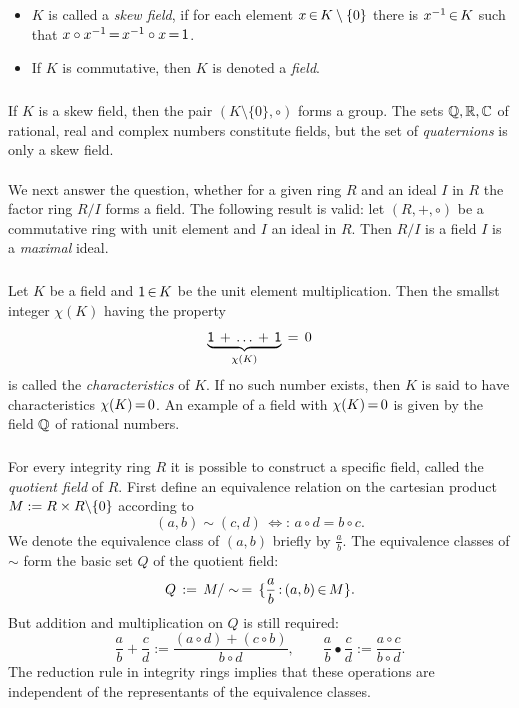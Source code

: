 \documentclass[11pt,twoside]{article}
\begin{document}
\begin{itemize}[leftmargin=15pt]
\item[1.]
$K$ is called a \textit{skew field},
if for each element $x {\,\in\,} K \setminus \{0\}$ there is $x^{-1} {\,\in\,} K$ 
such that $x \circ x^{-1} {\,=\,} x^{-1} \circ x {\,=\,} {\mathsf{1}}$.

\item[2.]
If $K$ is commutative, then $K$ is denoted a \textit{field}.
\end{itemize}

\subparagraph{}
If $K$ is a skew field,
then the pair $(K \setminus \{0\},\circ)$ forms a group.
The sets ${\mathbb{Q}}, {\mathbb{R}}, {\mathbb{C}}$ of rational, real and complex numbers
constitute fields,
but the set of \textit{quaternions} is only a skew field.

\paragraph{}
We next answer the question,
whether for a given ring $R$ and an ideal $I$ in $R$
the factor ring $R/I$ forms a field.
The following result is valid:
let $(R,+,\circ)$ be a commutative ring with unit element and $I$ an ideal in $R$. 
Then $R/I$ is a field
\iff
$I$ is a \textit{maximal} ideal.

\subparagraph{}
Let $K$ be a field and ${\mathsf{1}} {\,\in\,} K$ be the unit element {\wrt} multiplication.
Then the smallst integer $\chi(K)$ having the property
\[
\underbrace{{\mathsf{1}} \,+\, \ldots \,+\, {\mathsf{1}}}_{\chi(K)} \,=\, 0
\]
is called the \textit{characteristics} of $K$.
If no such number exists,
then $K$ is said to have characteristics $\chi(K) {\,=\,} 0$.
An example of a field with $\chi(K) {\,=\,} 0$
is given by the field ${\mathbb{Q}}$ of rational numbers.

\subparagraph{}
For every integrity ring $R$ it is possible to construct a specific field,
called the \textit{quotient field} of $R$.
First define an equivalence relation on the cartesian product
$M := R \times R {\setminus} \{0\}$ according to
\[
(a,b) \sim (c,d) \, \Leftrightarrow : \, a \circ d = b \circ c.
\]
We denote the equivalence class of $(a,b)$ briefly by $\frac{a}{b}$.
The equivalence classes of $\sim$ form the basic set $Q$
of the quotient field:
\[
Q \,:=\, M / \sim \,=\, \{ \frac{a}{b} {\,:\,} (a,b) {\,\in\,} M \}.
\]
But addition and multiplication on $Q$ is still required:
\[
\frac{a}{b} + \frac{c}{d} := \frac{(a \circ d) + (c \circ b)}{b \circ d},
\quad \quad
\frac{a}{b} \bullet \frac{c}{d} := \frac{a \circ c}{b \circ d}.
\]
The reduction rule in integrity rings implies
that these operations are independent of the representants
of the equivalence classes.
\end{document}
